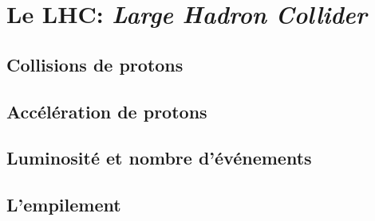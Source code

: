 \section{Le LHC: \emph{Large Hadron Collider}}\label{chapter-LHC-section-LHC}

\subsection{Collisions de protons}\label{chapter-LHC-section-LHC-subsec-pp_collisions}

\subsection{Accélération de protons}\label{chapter-LHC-section-LHC-subsec-pp_acceleration}

\subsection{Luminosité et nombre d'événements}\label{chapter-LHC-section-LHC-subsec-lumi}

\subsection{L'empilement}\label{chapter-LHC-section-LHC-subsec-PU}

